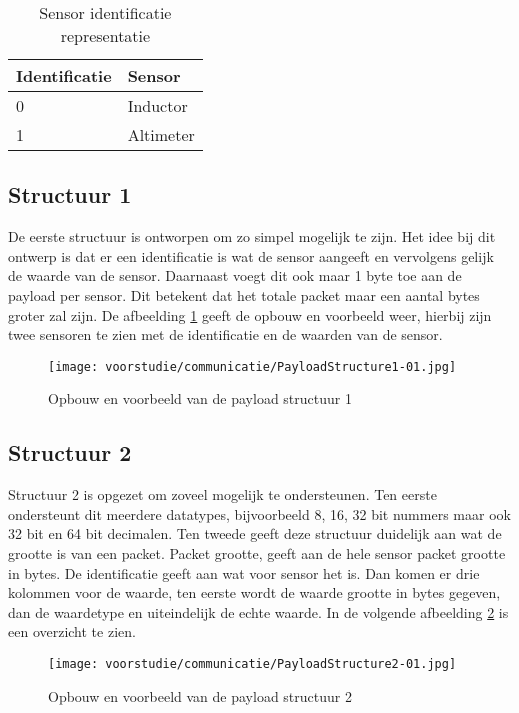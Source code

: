 \begin{table}[h!]
	\centering
	\caption{Sensor identificatie representatie}
	\label{tab:SensorRep}
	\begin{tabular}{p{4cm}p{6cm}}
	\toprule
	Identificatie & Sensor        \\ \midrule
	0      & Inductor  \\
	1      & Altimeter \\ \bottomrule
	\end{tabular}%
\end{table}

\subsection{Structuur 1}
De eerste structuur is ontworpen om zo simpel mogelijk te zijn. Het idee bij dit ontwerp is dat er een identificatie is wat de sensor aangeeft en vervolgens gelijk de waarde van de sensor. Daarnaast voegt dit ook maar 1 byte toe aan de payload per sensor. Dit betekent dat het totale packet maar een aantal bytes groter zal zijn. De afbeelding \ref{fig:Structure1} geeft de opbouw en voorbeeld weer, hierbij zijn twee sensoren te zien met de identificatie en de waarden van de sensor.
\begin{figure}[h!]
	\centering
	\label{fig:Structure1}


	\texttt{[image: voorstudie/communicatie/PayloadStructure1-01.jpg]}
	\caption{Opbouw en voorbeeld van de payload structuur 1}
\end{figure}

\newpage
\subsection{Structuur 2}
Structuur 2 is opgezet om zoveel mogelijk te ondersteunen. Ten eerste ondersteunt dit meerdere datatypes, bijvoorbeeld 8, 16, 32 bit nummers maar ook 32 bit en 64 bit decimalen. Ten tweede geeft deze structuur duidelijk aan wat de grootte is van een packet. Packet grootte, geeft aan de hele sensor packet grootte in bytes. De identificatie geeft aan wat voor sensor het is. Dan komen er drie kolommen voor de waarde, ten eerste wordt de waarde grootte in bytes gegeven, dan de waardetype en uiteindelijk de echte waarde. In de volgende afbeelding \ref{fig:Structure2} is een overzicht te zien.
\begin{figure}[h!]
	\centering
	\label{fig:Structure2}

	\texttt{[image: voorstudie/communicatie/PayloadStructure2-01.jpg]}
	\caption{Opbouw en voorbeeld van de payload structuur 2}
\end{figure}
